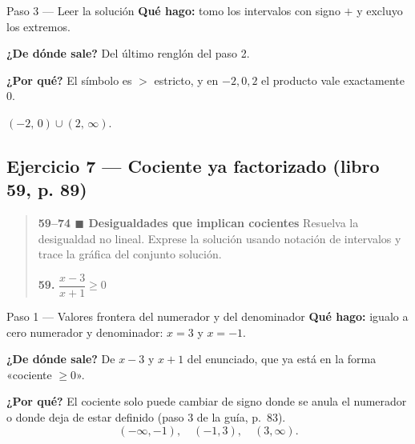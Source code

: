 \documentclass[11pt]{article}
\begin{document}
\begin{paso}{Paso 3 --- Leer la solución}
\textbf{Qué hago:} tomo los intervalos con signo $+$ y excluyo los extremos.

\textbf{¿De dónde sale?} Del último renglón del paso 2.

\textbf{¿Por qué?} El símbolo es $>$ estricto, y en $-2,0,2$ el producto vale exactamente $0$.
\end{paso}

\begin{center}
\end{center}

\begin{resp}
$(-2,\,0)\cup(2,\,\infty)$.
\end{resp}

\subsection*{Ejercicio 7 --- Cociente ya factorizado (libro 59, p. 89)}

\begin{quote}
\textbf{59--74 $\blacksquare$ Desigualdades que implican cocientes} \; Resuelva la desigualdad no lineal. Exprese la solución usando notación de intervalos y trace la gráfica del conjunto solución.

\textbf{59.} $\dfrac{x-3}{x+1}\ge 0$
\end{quote}

\begin{paso}{Paso 1 --- Valores frontera del numerador y del denominador}
\textbf{Qué hago:} igualo a cero numerador y denominador: $x=3$ y $x=-1$.

\textbf{¿De dónde sale?} De $x-3$ y $x+1$ del enunciado, que ya está en la forma «cociente $\ge 0$».

\textbf{¿Por qué?} El cociente solo puede cambiar de signo donde se anula el numerador o donde deja de estar definido (paso 3 de la guía, p.~83).
\[
(-\infty,-1),\quad (-1,3),\quad (3,\infty).
\]
\end{paso}
\end{document}
